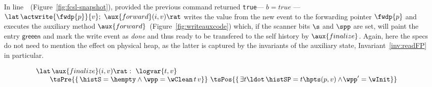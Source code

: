 In line~\lineWrtFwd~(Figure~\ref{fig:fcsl-snapshot}), provided the
previous command returned {\tt true}--- \ie $b = true$ --- $ \lat\,
\actwrite{\fwdp{p}}{v};\ \aux{forward}(i,v)\rat $ writes the value
from the new event to the forwarding pointer $\fwdp{p}$ and executes
the auxiliary method $\aux{forward}$~(Figure~\ref{fig:writeauxcode})
which, if the scanner bits $\s$ and $\spp$ are set, will paint the
entry $\mathsf{greeen}$ and mark the write event as {\it done} and
thus ready to be transfered to the self history by
$\aux{finalize}$. Again, here the specs do not need to mention the
effect on physical heap, as the latter is captured by the invariants
of the auxiliary state, Invariant~\ref{inv:readFP} in particular.

\[
\begin{array}{l}
  \lat\,\aux{finalize}(i,v)\rat :\ \logvar{t,v}\\
  ~~~~~~ \tsPre{\{\, \histS = \hempty \wedge
    \wpp = \wClean\, t\, v \}}\
  \tsPos{\{\, \exists t\ldot\, \histSP = t \hpts (p,v) \wedge\!
    \wpp' = \wInit \}}
\end{array}
\]


